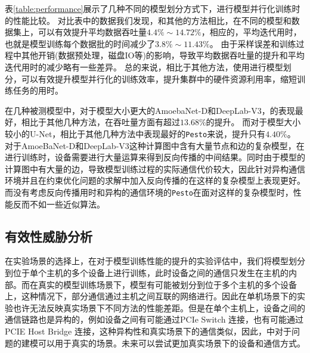 

表\ref{table:performance}展示了几种不同的模型划分方式下，进行模型并行化训练时的性能比较。
对比表中的数据我们发现，\sys{}和其他的方法相比，在不同的模型和数据集上，可以有效提升平均数据吞吐量$4.4\% \sim 14.72\%$，相应的，平均迭代用时，也就是模型训练每个数据批的时间减少了$3.8\% \sim  11.43\%$。
由于采样误差和训练过程中其他开销(数据预处理，磁盘IO等)的影响，导致平均数据吞吐量的提升和平均迭代用时的减少略有一些差异。
总的来说，相比于其他方法，使用\sys{}进行模型划分，可以有效提升模型并行化的训练效率，提升集群中的硬件资源利用率，缩短训练任务的用时。


在几种被测模型中，对于模型大小更大的AmoebaNet-D和DeepLab-V3，\sys{}的表现最好，相比于其他几种方法，在吞吐量方面有超过$13.68\%$的提升。
而对于模型大小较小的U-Net，\sys{}相比于其他几种方法中表现最好的\texttt{Pesto}来说，提升只有$4.40\%$。
对于AmoeBaNet-D和DeepLab-V3这种计算图中含有大量节点和边的复杂模型，在进行训练时，设备需要进行大量运算来得到反向传播的中间结果。同时由于模型的计算图中有大量的边，导致模型训练过程的实际通信代价较大，因此针对异构通信环境并且在约束优化问题的求解中加入反向传播的\sys{}在这样的复杂模型上表现更好。而没有考虑反向传播用时和异构的通信环境的\texttt{Pesto}在面对这样的复杂模型时，性能反而不如一些近似算法。

\subsection{有效性威胁分析}
\label{sec:threat}


在实验场景的选择上，在\sys 对于模型训练性能的提升的实验评估中，我们将模型划分到位于单个主机的多个设备上进行训练，此时设备之间的通信只发生在主机的内部。而在真实的模型训练场景下，模型有可能被划分到位于多个主机的多个设备上，这种情况下，部分通信通过主机之间互联的网络进行。因此在单机场景下的实验也许无法反映真实场景下不同方法的性能差距。但是在单个主机上，设备之间的通信链路也是异构的，例如设备之间有可能通过PCIe Switch 连接，也有可能通过PCIE Host Bridge 连接，这种异构性和真实场景下的通信类似，因此，\sys 中对于问题的建模可以用于真实的场景。未来可以尝试更加真实场景下的设备和通信方式。



